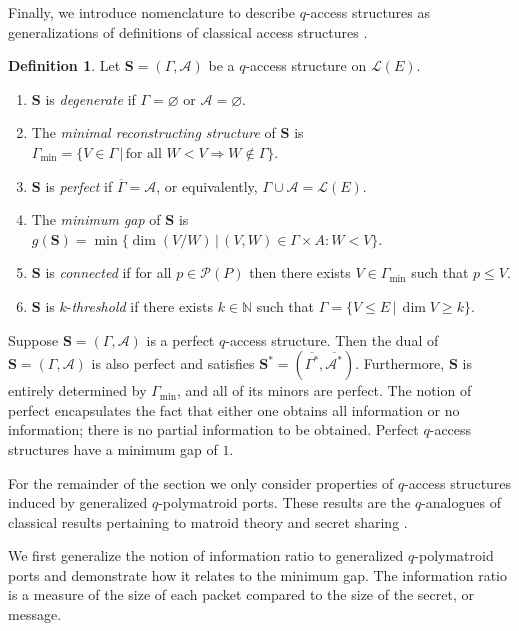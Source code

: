 \documentclass[onecolumn,draftclsnofoot,12pt]{IEEEtran}
\renewcommand{\L}{\mathcal{L}}
\newcommand{\A}{\mathcal{A}}
\renewcommand{\P}{\mathcal{P}}
\renewcommand{\S}{\mathbf{S}}
\theoremstyle{plain} %
\theoremstyle{definition}
\newtheorem{definition}[theorem]{Definition}
\begin{document}
Finally, we introduce nomenclature to describe $q$-access structures as generalizations of definitions of classical access structures \cite{beimel2011secret}.
\begin{definition}
    Let $\S=(\Gamma,\A)$ be a $q$-access structure on $\L(E)$. 
    \begin{enumerate}
        \item $\S$ is \textit{degenerate} if $\Gamma=\varnothing$ or $\A=\varnothing$.
        \item The \textit{minimal reconstructing structure} of $\S$ is $\Gamma_{\min} = \{V\in \Gamma \,|\, \text{for all } W<V \Rightarrow W \notin \Gamma\}$.
        \item $\S$ is \textit{perfect} if $\overline{\Gamma} = \A$, or equivalently, $\Gamma \cup \A = \L(E)$.
        \item The \textit{minimum gap} of $\S$ is $g(\S) = \min\{ \dim(V/W) \,|\, (V,W) \in \Gamma \times A\colon W<V\}.$
        \item $\mathbf{S}$ is \textit{connected} if for all $p\in \P(P)$ then there exists $V\in \Gamma_{\min}$ such that $p\leq V$.
        \item $\S$ is $k$-\textit{threshold} if there exists $k\in \mathbb{N}$ such that $\Gamma = \{ V\leq E \,| \, \dim V \geq k\}.$
    \end{enumerate}
\end{definition}

 Suppose $\S=(\Gamma,\A)$ is a perfect $q$-access structure. Then the dual of $\S=(\Gamma,\A)$ is also perfect and satisfies $\S^*=(\overline{\Gamma^*},\overline{\A^*})$. Furthermore, $\S$ is entirely determined by $\Gamma_{\min}$, and all of its minors are perfect. The notion of perfect encapsulates the fact that either one obtains all information or no information; there is no partial information to be obtained. Perfect $q$-access structures have a minimum gap of $1$.


For the remainder of the section we only consider properties of $q$-access structures induced by generalized $q$-polymatroid ports. These results are the $q$-analogues of classical results pertaining to matroid theory and secret sharing \cite{cryptoeprint:2012/595}.

We first generalize the notion of information ratio to generalized $q$-polymatroid ports and demonstrate how it relates to the minimum gap. The information ratio is a measure of the size of each packet compared to the size of the secret, or message.
\end{document}
